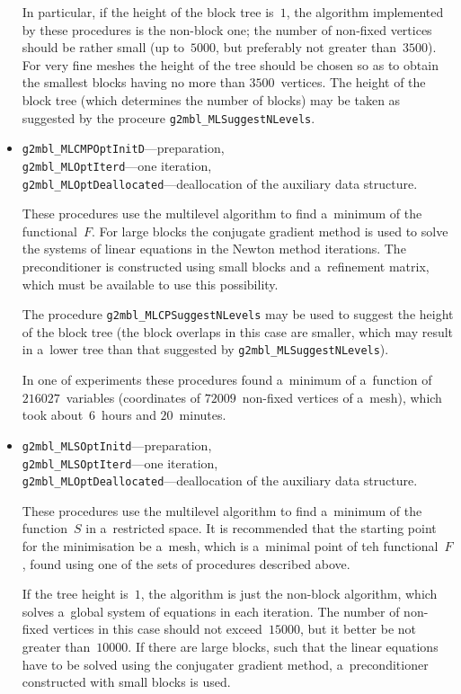 \begin{itemize}
    In particular, if the height of the block tree is~$1$, the algorithm
    implemented by these procedures is the non-block one; the number of
    non-fixed vertices should be rather small (up to~$5000$, but preferably
    not greater than~$3500$). For very fine meshes the height of the tree
    should be chosen so as to obtain the smallest blocks having no more than
    $3500$~vertices. The height of the block tree (which determines the number
    of blocks) may be taken as suggested by the proceure
    \texttt{g2mbl\_MLSuggestNLevels}.
  \item \texttt{g2mbl\_MLCMPOptInitD}---preparation, \\
    \texttt{g2mbl\_MLOptIterd}---one iteration, \\
    \texttt{g2mbl\_MLOptDeallocated}---deallocation of the auxiliary data
      structure.

    These procedures use the multilevel algorithm to find a~minimum of the
    functional~$F$. For large blocks the conjugate gradient method is used
    to solve the systems of linear equations in the Newton method
    iterations. The preconditioner is constructed using small blocks and
    a~refinement matrix, which must be available to use this possibility.

    The procedure \texttt{g2mbl\_MLCPSuggestNLevels} may be used to suggest
    the height of the block tree (the block overlaps in this case are
    smaller, which may result in a~lower tree than that suggested by
    \texttt{g2mbl\_MLSuggestNLevels}).

    In one of experiments these procedures found a~minimum of a~function of
    $216027$~variables (coordinates of $72009$~non-fixed vertices of
    a~mesh), which took about~$6$~hours and $20$~minutes.
  \item \texttt{g2mbl\_MLSOptInitd}---preparation, \\
    \texttt{g2mbl\_MLSOptIterd}---one iteration, \\
    \texttt{g2mbl\_MLOptDeallocated}---deallocation of the auxiliary data
      structure.

    These procedures use the multilevel algorithm to find a~minimum of the
    function~$S$ in a~restricted space. It is recommended that the starting
    point for the minimisation be a~mesh, which is a~minimal point of teh
    functional~$F$, found using one of the sets of procedures described
    above.

    If the tree height is~$1$, the
    algorithm is just the non-block algorithm, which solves a~global system
    of equations in each iteration. The number of non-fixed vertices in this
    case should not exceed~$15000$, but it better be not greater
    than~$10000$. If there are large blocks, such that the linear equations
    have to be solved using the conjugater gradient method, a~preconditioner
    constructed with small blocks is used.


\end{itemize}
